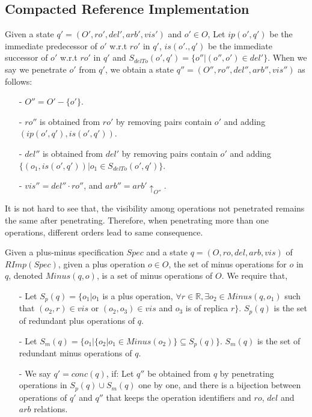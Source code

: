 \subsection{Compacted Reference Implementation}
\label{subsec:compacted reference implementation}

Given a state $q'=(O',ro',del',arb',vis')$ and $o' \in O$, Let $ip(o',q')$ be the immediate predecessor of $o'$ w.r.t $ro'$ in $q'$, $is(o'.,q')$ be the immediate successor of $o'$ w.r.t $ro'$ in $q'$ and $S_{delTo}(o',q') = \{o'' \vert (o'',o') \in del' \}$. When we say we penetrate $o'$ from $q'$, we obtain a state $q''=(O'',ro'',del'',arb'',vis'')$ as follows:

\begin{itemize}
\setlength{\itemsep}{0.5pt}
\item[-] $O'' = O' - \{ o' \}$.

\item[-] $ro''$ is obtained from $ro'$ by removing pairs contain $o'$ and adding $(ip(o',q'),is(o',q'))$.

\item[-] $del''$ is obtained from $del'$ by removing pairs contain $o'$ and adding $\{ (o_1,is(o',q')) \vert o_1 \in S_{delTo}(o',q')\}$.

\item[-] $vis'' = del'' \cdot ro''$, and $arb'' = arb' \uparrow_{O''}$.
\end{itemize}

It is not hard to see that, the visibility among operations not penetrated remains the same after penetrating. Therefore, when penetrating more than one operations, different orders lead to same consequence.

Given a plus-minus specification $Spec$ and a state $q=(O,ro,del,arb,vis)$ of $RImp(Spec)$, given a plus operation $o \in O$, the set of minus operations for $o$ in $q$, denoted $Minus(q,o)$, is a set of minus operations of $O$. We require that,

\begin{itemize}
\setlength{\itemsep}{0.5pt}
\item[-] Let $S_p(q) = \{ o_1 \vert o_1$ is a plus operation, $\forall r \in \mathbb{R}, \exists o_2 \in Minus(q,o_1)$ such that $(o_2,r) \in vis$ or $(o_2,o_3) \in vis$ and $o_3$ is of replica $r\}$. $S_p(q)$ is the set of redundant plus operations of $q$.

\item[-] Let $S_m(q) = \{ o_1 \vert  \{ o_2 \vert o_1 \in Minus(o_2) \} \subseteq S_p(q) \}$. $S_m(q)$ is the set of redundant minus operations of $q$.

\item[-] We say $q' = conc(q)$, if: Let $q''$ be obtained from $q$ by penetrating operations in $S_p(q) \cup S_m(q)$ one by one, and there is a bijection between operations of $q'$ and $q''$ that keeps the operation identifiers and $ro$, $del$ and $arb$ relations. 
\end{itemize}


